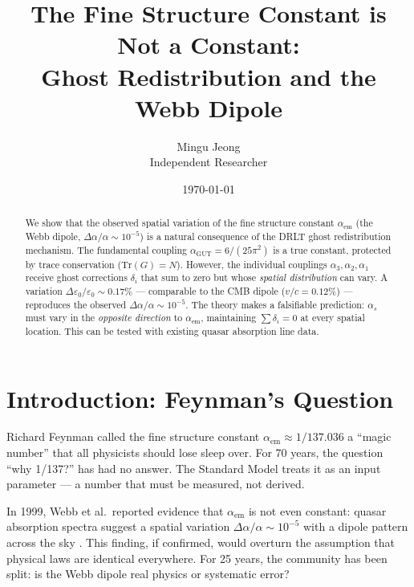 \documentclass[12pt]{article}
\theoremstyle{remark}
\begin{document}
\title{The Fine Structure Constant is Not a Constant:\\Ghost Redistribution and the Webb Dipole}
\author{Mingu Jeong\\Independent Researcher}
\date{\today}
\maketitle

\begin{abstract}
We show that the observed spatial variation of the fine structure constant $\alpha_\text{em}$ (the Webb dipole, $\Delta\alpha/\alpha \sim 10^{-5}$) is a natural consequence of the DRLT ghost redistribution mechanism. The fundamental coupling $\alpha_\text{GUT} = 6/(25\pi^2)$ is a true constant, protected by trace conservation ($\text{Tr}(G) = N$). However, the individual couplings $\alpha_3, \alpha_2, \alpha_1$ receive ghost corrections $\delta_i$ that sum to zero but whose \emph{spatial distribution} can vary. A variation $\Delta\varepsilon_0/\varepsilon_0 \sim 0.17\%$ --- comparable to the CMB dipole ($v/c = 0.12\%$) --- reproduces the observed $\Delta\alpha/\alpha \sim 10^{-5}$. The theory makes a falsifiable prediction: $\alpha_s$ must vary in the \emph{opposite direction} to $\alpha_\text{em}$, maintaining $\sum\delta_i = 0$ at every spatial location. This can be tested with existing quasar absorption line data.
\end{abstract}

\tableofcontents

\section{Introduction: Feynman's Question}

Richard Feynman called the fine structure constant $\alpha_\text{em} \approx 1/137.036$ a ``magic number'' that all physicists should lose sleep over. For 70 years, the question ``why 1/137?'' has had no answer. The Standard Model treats it as an input parameter --- a number that must be measured, not derived.

In 1999, Webb et al.\ reported evidence that $\alpha_\text{em}$ is not even constant: quasar absorption spectra suggest a spatial variation $\Delta\alpha/\alpha \sim 10^{-5}$ with a dipole pattern across the sky \cite{Webb}. This finding, if confirmed, would overturn the assumption that physical laws are identical everywhere. For 25 years, the community has been split: is the Webb dipole real physics or systematic error?
\end{document}
